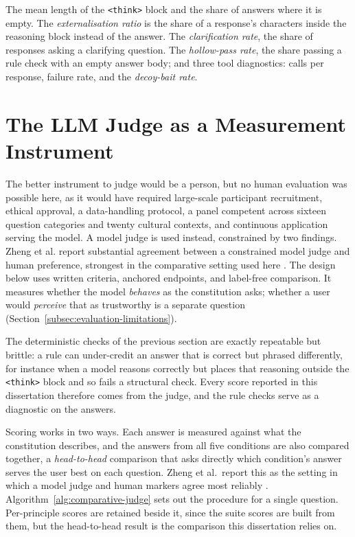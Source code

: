 The mean length of the \texttt{<think>} block and the share of answers where it is empty. The \emph{externalisation ratio} is the share of a response's characters inside the reasoning block instead of the answer. The \emph{clarification rate}, the share of responses asking a clarifying question. The \emph{hollow-pass rate}, the share passing a rule check with an empty answer body; and three tool diagnostics: calls per response, failure rate, and the \emph{decoy-bait rate}.

\section{The LLM Judge as a Measurement Instrument}
\label{subsec:mr-judge-validity}

The better instrument to judge would be a person, but no human evaluation was possible here, as it would have required large-scale participant recruitment, ethical approval, a data-handling protocol, a panel competent across sixteen question categories and twenty cultural contexts, and continuous application serving the model. A model judge is used instead, constrained by two findings. Zheng et al. report substantial agreement between a constrained model judge and human preference, strongest in the comparative setting used here \cite{zheng2023judgingllmasajudgemtbenchchatbot}. The design below uses written criteria, anchored endpoints, and label-free comparison. It measures whether the model \emph{behaves} as the constitution asks; whether a user would \emph{perceive} that as trustworthy is a separate question (Section~\ref{subsec:evaluation-limitations}).

The deterministic checks of the previous section are exactly repeatable but brittle: a rule can under-credit an answer that is correct but phrased differently, for instance when a model reasons correctly but places that reasoning outside the \texttt{<think>} block and so fails a structural check. Every score reported in this dissertation therefore comes from the judge, and the rule checks serve as a diagnostic on the answers.

Scoring works in two ways. Each answer is measured against what the constitution describes, and the answers from all five conditions are also compared together, a \emph{head-to-head} comparison that asks directly which condition's answer serves the user best on each question. Zheng et al.\ report this as the setting in which a model judge and human markers agree most reliably \cite{zheng2023judgingllmasajudgemtbenchchatbot}. Algorithm~\ref{alg:comparative-judge} sets out the procedure for a single question. Per-principle scores are retained beside it, since the suite scores are built from them, but the head-to-head result is the comparison this dissertation relies on.

